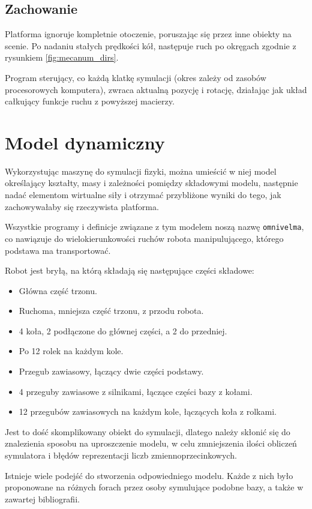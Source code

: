	\subsection{Zachowanie}
		Platforma ignoruje kompletnie otoczenie, poruszając się przez inne obiekty na scenie.
		Po nadaniu stałych prędkości kół, następuje ruch po okręgach zgodnie z rysunkiem \ref{fig:mecanum_dirs}.

		Program sterujący, co każdą klatkę symulacji (okres zależy od zasobów procesorowych komputera), zwraca aktualną pozycję i rotację, 
		działając jak układ całkujący funkcje ruchu z powyższej macierzy.

\section{Model dynamiczny}
	\label{sec:omnivelma}
	Wykorzystując maszynę do symulacji fizyki, można umieścić w niej model określający kształty, masy i zależności pomiędzy składowymi modelu, 
	następnie nadać elementom wirtualne siły i otrzymać przybliżone wyniki do tego, jak zachowywałaby się rzeczywista platforma.

	Wszystkie programy i definicje związane z tym modelem noszą nazwę \texttt{omnivelma}, co nawiązuje do wielokierunkowości ruchów robota manipulującego, którego podstawa ma transportować.

	Robot jest bryłą, na którą składają się następujące części składowe:
	\begin{itemize}
	\item Główna część trzonu.
	\item Ruchoma, mniejsza część trzonu, z przodu robota.
	\item 4 koła, 2 podłączone do głównej części, a 2 do przedniej.
	\item Po 12 rolek na każdym kole.
	\item Przegub zawiasowy, łączący dwie części podstawy.
	\item 4 przeguby zawiasowe z silnikami, łączące części bazy z kołami.
	\item 12 przegubów zawiasowych na każdym kole, łączących koła z rolkami.
	\end{itemize}

	Jest to dość skomplikowany obiekt do symulacji, dlatego należy skłonić się do znalezienia sposobu na uproszczenie modelu, w celu zmniejszenia ilości obliczeń symulatora
	i błędów reprezentacji liczb zmiennoprzecinkowych.

	Istnieje wiele podejść do stworzenia odpowiedniego modelu. Każde z nich było proponowane na różnych forach przez osoby symulujące podobne bazy, a także w zawartej bibliografii.
	
